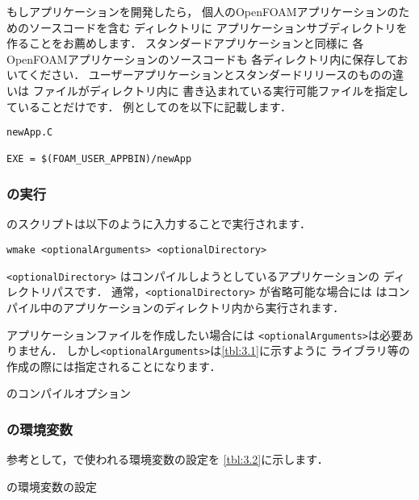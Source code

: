 もしアプリケーションを開発したら，
個人のOpenFOAMアプリケーションのためのソースコードを含む
ディレクトリに
アプリケーションサブディレクトリを作ることをお薦めします．
スタンダードアプリケーションと同様に
各OpenFOAMアプリケーションのソースコードも
各ディレクトリ内に保存しておいてください．
ユーザーアプリケーションとスタンダードリリースのものの違いは
ファイルがディレクトリ内に
書き込まれている実行可能ファイルを指定していることだけです．
例としてのを以下に記載します．
\begin{OFfile}
\begin{verbatim}
newApp.C

EXE = $(FOAM_USER_APPBIN)/newApp
\end{verbatim}%
\end{OFfile}

\subsubsection{の実行}
\label{sssec:3.2.2.4}
のスクリプトは以下のように入力することで実行されます．
\begin{OFterminal}
\begin{verbatim}
wmake <optionalArguments> <optionalDirectory>
\end{verbatim}
\end{OFterminal}
\verb|<optionalDirectory>| はコンパイルしようとしているアプリケーションの
ディレクトリパスです．
通常，\verb|<optionalDirectory>| が省略可能な場合には
はコンパイル中のアプリケーションのディレクトリ内から実行されます．


アプリケーションファイルを作成したい場合には
\verb|<optionalArguments>|は必要ありません．
しかし\verb|<optionalArguments>|は\autoref{tbl:3.1}に示すように
ライブラリ等の作成の際には指定されることになります．


\begin{table}[ht]
 
 \caption{のコンパイルオプション}
 \label{tbl:3.1}
\end{table}


\subsubsection{の環境変数}
\label{sssec:3.2.2.5}
参考として，で使われる環境変数の設定を
\autoref{tbl:3.2}に示します．


\begin{table}[ht]
 
 \caption{の環境変数の設定}
 \label{tbl:3.2}
\end{table}


